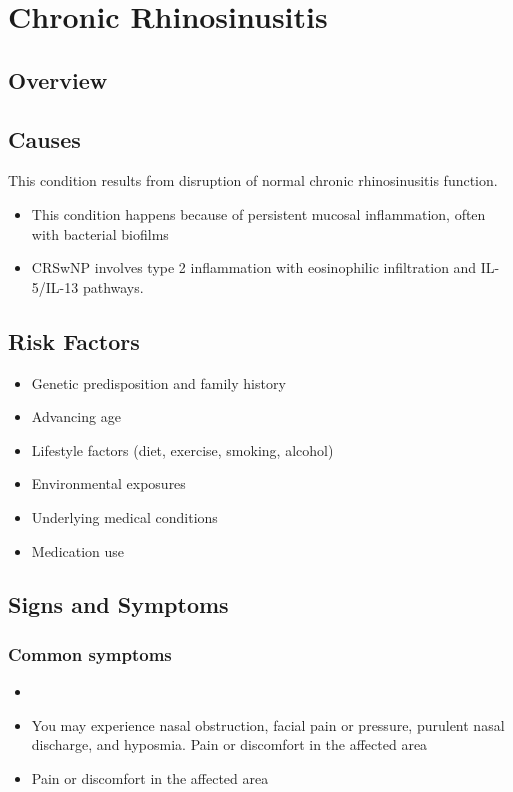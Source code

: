 \chapter{Chronic Rhinosinusitis}
\label{sec:Chronic Rhinosinusitis}

\section{Overview}

\section{Causes}
This condition results from disruption of normal chronic rhinosinusitis function.

\begin{itemize}[noitemsep]
  \item This condition happens because of persistent mucosal inflammation, often with bacterial biofilms
  \item CRSwNP involves type 2 inflammation with eosinophilic infiltration and IL-5/IL-13 pathways.
\end{itemize}
\section{Risk Factors}


\begin{itemize}[noitemsep]
  \item Genetic predisposition and family history
  \item Advancing age
  \item Lifestyle factors (diet, exercise, smoking, alcohol)
  \item Environmental exposures
  \item Underlying medical conditions
  \item Medication use
\end{itemize}
\section{Signs and Symptoms}

\subsection{Common symptoms}
\begin{itemize}[noitemsep]
  \item \item You may experience nasal obstruction, facial pain or pressure, purulent nasal discharge, and hyposmia. Pain or discomfort in the affected area    \item Pain or discomfort in the affected area
  \end{itemize}

